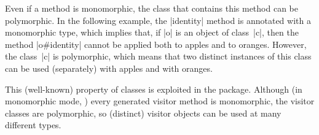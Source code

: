 \documentclass[11pt,a4paper,twoside]{article}
\begin{document}
Even if a method is monomorphic, the class that contains this method can be
polymorphic. In the following example, the \oc|identity| method is annotated
with a monomorphic type, which implies that, if \oc|o| is an object of
class~\oc|c|, then the method \oc|o#identity| cannot be applied both to apples
and to oranges. However, the class~\oc|c| is polymorphic, which means that two
distinct instances of this class can be used (separately) with apples and with
oranges.
\begin{origenv}

\end{origenv}
This (well-known) property of classes is exploited in the \visitors package.
Although (in monomorphic mode, ) every
generated visitor method is monomorphic, the visitor classes are
polymorphic, so (distinct) visitor objects can be used at many different
types.

\end{document}
